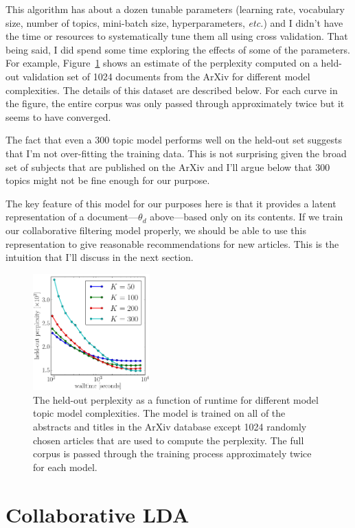\documentclass[11pt]{article}
\newcommand{\fig}[1]{Figure~\ref{fig:#1}}
\newcommand{\figlabel}[1]{\label{fig:#1}}
\begin{document}
This algorithm has about a dozen tunable parameters (learning rate, vocabulary
size, number of topics, mini-batch size, hyperparameters, \emph{etc.}) and I
didn't have the time or resources to systematically tune them all using cross
validation.
That being said, I did spend some time exploring the effects of some of the
parameters.
For example, \fig{lda-results} shows an estimate of the perplexity computed on
a held-out validation set of 1024 documents from the ArXiv for different model
complexities.
The details of this dataset are described below.
For each curve in the figure, the entire corpus was only passed through
approximately twice but it seems to have converged.

The fact that even a 300 topic model performs well on the held-out set
suggests that I'm not over-fitting the training data.
This is not surprising given the broad set of subjects that are published on
the ArXiv and I'll argue below that 300 topics might not be fine enough for
our purpose.

The key feature of this model for our purposes here is that it provides a
latent representation of a document---$\theta_d$ above---based only on its
contents.
If we train our collaborative filtering model properly, we should be able to
use this representation to give reasonable recommendations for new articles.
This is the intuition that I'll discuss in the next section.

\begin{figure}
\centering
\includegraphics[width=0.4\textwidth]{lda-results-k.pdf}
\caption{%
The held-out perplexity as a function of runtime for different model
topic model complexities.
The model is trained on all of the abstracts and titles in the ArXiv database
except 1024 randomly chosen articles that are used to compute the perplexity.
The full corpus is passed through the training process approximately twice for
each model.
\figlabel{lda-results}}
\end{figure}

\section{Collaborative LDA}
\end{document}
